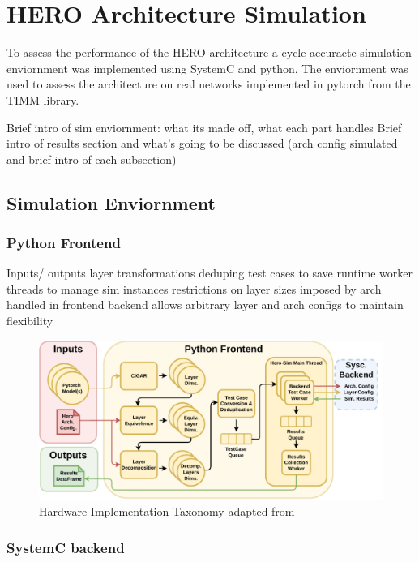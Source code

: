 
\chapter{HERO Architecture Simulation}
\label{chap:results}

To assess the performance of the HERO architecture a cycle accuracte simulation
enviornment was implemented using SystemC and python. The enviornment was used
to assess the architecture on real networks implemented in pytorch from the TIMM
library.

Brief intro of sim enviornment: what its made off, what each part handles
Brief intro of results section and what's going to be discussed (arch config
simulated and brief intro of each subsection)

\section{Simulation Enviornment}
\label{chap:hero:sim_platform}

\subsection{Python Frontend}
\label{chap:hero:sim_platform:cigar_side}

Inputs/ outputs
layer transformations
deduping test cases to save runtime
worker threads to manage sim instances
restrictions on layer sizes imposed by arch handled in frontend
backend allows arbitrary layer and arch configs to maintain flexibility


\begin{figure}[ht]
    \centering
    \includegraphics[scale=0.58]{fig/hero-sim-frontend.pdf}
    \caption{Hardware Implementation Taxonomy adapted from \cite{maestro}}
    \label{fig:hw_taxonomy}
\end{figure}


\subsection{SystemC backend}
\label{chap:hero:sim_platform:cigar_side}

